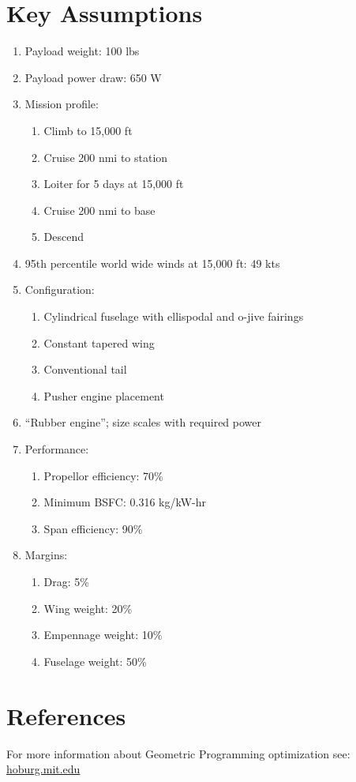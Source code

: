\documentclass[10pt, a4paper]{article}
\begin{document}
\section*{Key Assumptions}

\begin{enumerate}

    \item Payload weight: 100 lbs
    \item Payload power draw: 650 W
    \item Mission profile:
        \begin{enumerate}
            \item Climb to 15,000 ft
            \item Cruise 200 nmi to station
            \item Loiter for 5 days at 15,000 ft
            \item Cruise 200 nmi to base
            \item Descend 
            \end{enumerate}
    \item 95th percentile world wide winds at 15,000 ft: 49 kts
    \item Configuration: 
        \begin{enumerate}
            \item Cylindrical fuselage with ellispodal and o-jive fairings
            \item Constant tapered wing
            \item Conventional tail
            \item Pusher engine placement
            \end{enumerate}
    \item ``Rubber engine''; size scales with required power
    \item Performance:
        \begin{enumerate}
            \item Propellor efficiency: 70\%
            \item Minimum BSFC: 0.316 kg/kW-hr
            \item Span efficiency: 90\%
            \end{enumerate}
    \item Margins:
        \begin{enumerate}
            \item Drag: 5\%
            \item Wing weight: 20\%
            \item Empennage weight: 10\%
            \item Fuselage weight: 50\%
            \end{enumerate}

\end{enumerate}

\section*{References}

For more information about Geometric Programming optimization see: \url{hoburg.mit.edu}
\end{document}
